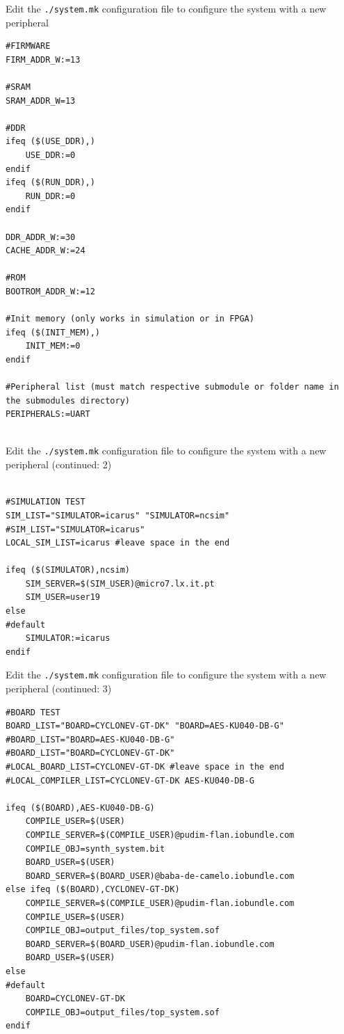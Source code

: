 \documentclass [xcolor=svgnames, t] {beamer}
\begin{document}
\begin{frame}[fragile]{Edit the {\tt ./system.mk} configuration file to configure the system with a new peripheral}
\begin{tiny}
\begin{lstlisting}
#FIRMWARE
FIRM_ADDR_W:=13

#SRAM
SRAM_ADDR_W=13

#DDR
ifeq ($(USE_DDR),)
	USE_DDR:=0
endif
ifeq ($(RUN_DDR),)
	RUN_DDR:=0
endif

DDR_ADDR_W:=30
CACHE_ADDR_W:=24

#ROM
BOOTROM_ADDR_W:=12

#Init memory (only works in simulation or in FPGA)
ifeq ($(INIT_MEM),)
	INIT_MEM:=0
endif

#Peripheral list (must match respective submodule or folder name in the submodules directory)
PERIPHERALS:=UART


\end{lstlisting}
\end{tiny}
\end{frame}


\begin{frame}[fragile]{Edit the {\tt ./system.mk} configuration file to configure the system with a new peripheral (continued: 2)}
\begin{tiny}
\begin{lstlisting}

#SIMULATION TEST
SIM_LIST="SIMULATOR=icarus" "SIMULATOR=ncsim"
#SIM_LIST="SIMULATOR=icarus"
LOCAL_SIM_LIST=icarus #leave space in the end

ifeq ($(SIMULATOR),ncsim)
	SIM_SERVER=$(SIM_USER)@micro7.lx.it.pt
	SIM_USER=user19
else
#default
	SIMULATOR:=icarus
endif

\end{lstlisting}
\end{tiny}
\end{frame}

\begin{frame}[fragile]{Edit the {\tt ./system.mk} configuration file to configure the system with a new peripheral (continued: 3)}
\begin{tiny}
\begin{lstlisting}
#BOARD TEST
BOARD_LIST="BOARD=CYCLONEV-GT-DK" "BOARD=AES-KU040-DB-G"
#BOARD_LIST="BOARD=AES-KU040-DB-G"
#BOARD_LIST="BOARD=CYCLONEV-GT-DK"
#LOCAL_BOARD_LIST=CYCLONEV-GT-DK #leave space in the end
#LOCAL_COMPILER_LIST=CYCLONEV-GT-DK AES-KU040-DB-G

ifeq ($(BOARD),AES-KU040-DB-G)
	COMPILE_USER=$(USER)
	COMPILE_SERVER=$(COMPILE_USER)@pudim-flan.iobundle.com
	COMPILE_OBJ=synth_system.bit
	BOARD_USER=$(USER)
	BOARD_SERVER=$(BOARD_USER)@baba-de-camelo.iobundle.com
else ifeq ($(BOARD),CYCLONEV-GT-DK)
	COMPILE_SERVER=$(COMPILE_USER)@pudim-flan.iobundle.com
	COMPILE_USER=$(USER)
	COMPILE_OBJ=output_files/top_system.sof
	BOARD_SERVER=$(BOARD_USER)@pudim-flan.iobundle.com
	BOARD_USER=$(USER)
else
#default
	BOARD=CYCLONEV-GT-DK
	COMPILE_OBJ=output_files/top_system.sof
endif

\end{lstlisting}
\end{tiny}
\end{frame}
\end{document}
